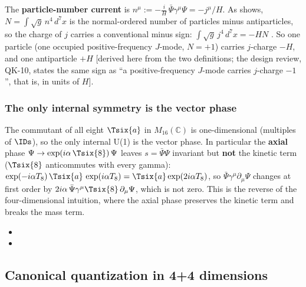 The \textbf{particle-number current} is $n^\mu:=-\frac{i}{H}\,\bar\Psi\gamma^\mu\Psi=-j^\mu/H$.
As  shows, $N=\int\sqrt g\,n^4\,d^7x$ is the normal-ordered number of particles
minus antiparticles, so the charge of $j$ carries a conventional minus sign:
$\int\sqrt g\,j^4\,d^7x=-HN$ . So one particle (one occupied positive-frequency
$J$-mode, $N=+1$) carries $j$-charge $-H$, and one antiparticle $+H$ [derived here from the two
definitions; the design review, QK-10, states the same sign as ``a positive-frequency $J$-mode
carries $j$-charge $-1$'', that is, in units of $H$].

\subsubsection{The only internal symmetry is the vector phase}
\label{sec:3.4.11}

The commutant of all eight $\Tsix{a}$ in $M_{16}(\mathbb C)$ is one-dimensional (multiples of
$\IDs$), so the only internal U(1) is the vector phase. In particular the \textbf{axial} phase
$\Psi\to\exp(i\alpha\,\Tsix{8})\,\Psi$ leaves $s=\bar\Psi\Psi$ invariant but \textbf{not} the kinetic
term ($\Tsix{8}$ anticommutes with every gamma):
$\exp(-i\alpha T_8)\,\Tsix{a}\,\exp(i\alpha T_8)=\Tsix{a}\exp(2i\alpha T_8)$, so
$\bar\Psi\gamma^\mu\partial_\mu\Psi$ changes at first order by
$2i\alpha\,\bar\Psi\gamma^\mu\Tsix{8}\,\partial_\mu\Psi$, which is not zero. This is the reverse of
the four-dimensional intuition, where the axial phase preserves the kinetic term and breaks the mass
term. 
\begin{itemize}
  \item {}
  \item {}
\end{itemize}

\subsection{Canonical quantization in 4+4 dimensions}
\label{sec:3.5}

